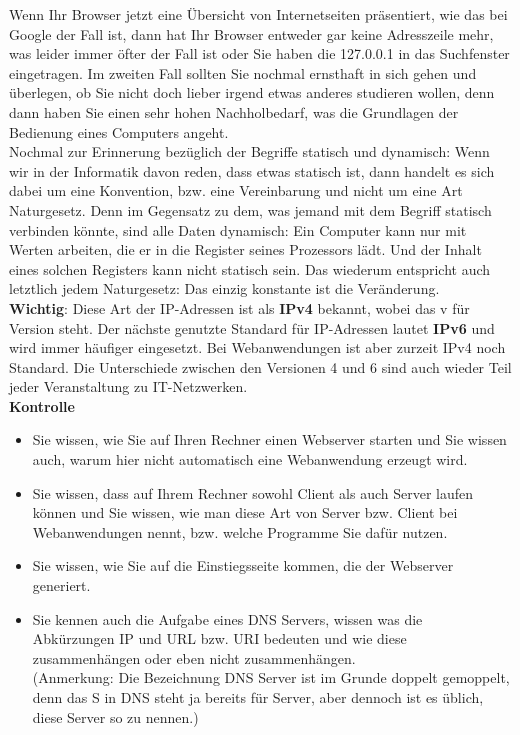 Wenn Ihr Browser jetzt eine Übersicht von Internetseiten präsentiert, wie das bei Google der Fall ist, dann hat Ihr Browser entweder gar keine Adresszeile mehr, was leider immer öfter der Fall ist oder Sie haben die 127.0.0.1 in das Suchfenster eingetragen. Im zweiten Fall sollten Sie nochmal ernsthaft in sich gehen und überlegen, ob Sie nicht doch lieber irgend etwas anderes studieren wollen, denn dann haben Sie einen sehr hohen Nachholbedarf, was die Grundlagen der Bedienung eines Computers angeht.\\

Nochmal zur Erinnerung bezüglich der Begriffe statisch und dynamisch: Wenn wir in der Informatik davon reden, dass etwas statisch ist, dann handelt es sich dabei um eine Konvention, bzw. eine Vereinbarung und nicht um eine Art Naturgesetz. Denn im Gegensatz zu dem, was jemand mit dem Begriff \glqq{}statisch\grqq{} verbinden könnte, sind alle Daten dynamisch: Ein Computer kann nur mit Werten arbeiten, die er in die Register seines Prozessors lädt. Und der Inhalt eines solchen Registers kann nicht statisch sein. Das wiederum entspricht auch letztlich jedem Naturgesetz: Das einzig konstante ist die Veränderung.\\

\textbf{Wichtig}: Diese Art der IP-Adressen ist als \textbf{IPv4} bekannt, wobei das v für Version steht. Der nächste genutzte Standard für IP-Adressen lautet \textbf{IPv6} und wird immer häufiger eingesetzt. Bei Webanwendungen ist aber zurzeit IPv4 noch Standard. Die Unterschiede zwischen den Versionen 4 und 6 sind auch wieder Teil jeder Veranstaltung zu IT-Netzwerken.\\

\textbf{Kontrolle}\\

\begin{itemize}
	\item Sie wissen, wie Sie auf Ihren Rechner einen Webserver starten und Sie wissen auch, warum hier nicht automatisch eine Webanwendung erzeugt wird.
	\item Sie wissen, dass auf Ihrem Rechner sowohl Client als auch Server laufen können und Sie wissen, wie man diese Art von Server bzw. Client bei Webanwendungen nennt, bzw. welche Programme Sie dafür nutzen.
	\item Sie wissen, wie Sie auf die Einstiegsseite kommen, die der Webserver generiert.
	\item Sie kennen auch die Aufgabe eines DNS Servers, wissen was die\\ Abkürzungen IP und URL bzw. URI bedeuten und wie diese zusammenhängen oder eben nicht zusammenhängen.\\
	(Anmerkung: Die Bezeichnung DNS Server ist im Grunde doppelt gemoppelt, denn das S in DNS steht ja bereits für Server, aber dennoch ist es üblich, diese Server so zu nennen.)
\end{itemize}

